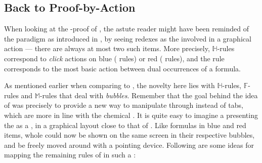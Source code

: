 \begin{scope}
\section{Back to Proof-by-Action}

When looking at the -proof of , the astute reader might
have been reminded of the  paradigm as introduced in
, by seeing redexes as the  involved in a graphical action
--- there are always at most two such items. More precisely, $\mathbb{H}$-rules
correspond to \emph{click} actions on blue ({\rnm{\mcirc{-}}} rules) or red
 ({\rnm{\mcirc{+}}} rules), and the {} rule corresponds to
the most basic  action between dual occurrences of a formula.

As mentioned earlier when comparing  to , the novelty here lies
with $\mathbb{H}$-rules, $\mathbb{F}$-rules and $\mathbb{M}$-rules that deal
with \emph{bubbles}. Remember that the goal behind the idea of 
was precisely to provide a new way to manipulate  through 
instead of tabs, which are more in line with the chemical . It is quite
easy to imagine a  presenting the  as a , in a graphical
layout close to that of . Like formulas in blue and red
items, whole  could now be shown on the same screen in their respective
bubbles, and be freely moved around with a pointing device. Following are some
ideas for mapping the remaining rules of  in such a :


%   


\end{scope}
